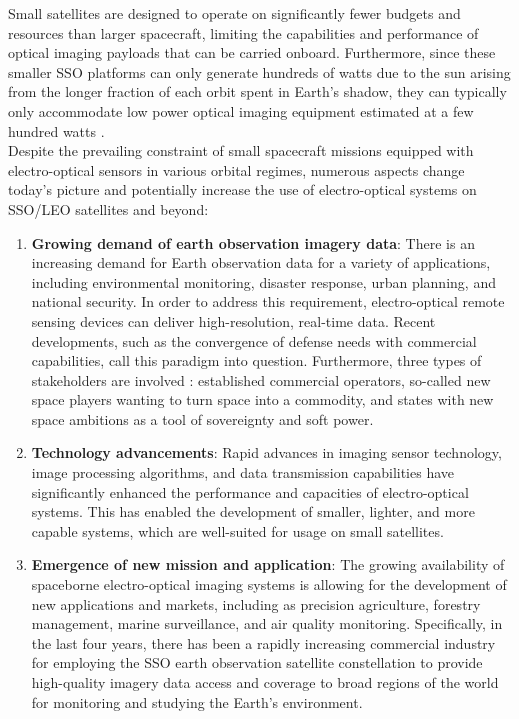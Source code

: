 \documentclass[final,5p,times,twocolumn]{elsarticle}
\begin{document}
Small satellites are designed to operate on significantly fewer budgets and resources than larger spacecraft, limiting the capabilities and performance of optical imaging payloads that can be carried onboard. Furthermore, since these smaller SSO platforms can only generate hundreds of watts due to the sun arising from the longer fraction of each orbit spent in Earth's shadow, they can typically only accommodate low power optical imaging equipment estimated at a few hundred watts \citep{selva2012survey}. \\
Despite the prevailing constraint of small spacecraft missions equipped with electro-optical sensors in various orbital regimes, numerous aspects change today's picture and potentially increase the use of electro-optical systems on SSO/LEO satellites and beyond:
\begin{enumerate}
	\item \textbf{Growing demand of earth observation imagery data}: There is an increasing demand for Earth observation data for a variety of applications, including environmental monitoring, disaster response, urban planning, and national security. In order to address this requirement, electro-optical remote sensing devices can deliver high-resolution, real-time data. Recent developments, such as the convergence of defense needs with commercial capabilities, call this paradigm into question. Furthermore, three types of stakeholders are involved  \citep{denis2017towards}: established commercial operators, so-called new space players wanting to turn space into a commodity, and states with new space ambitions as a tool of sovereignty and soft power.
	\item \textbf{Technology advancements}: Rapid advances in imaging sensor technology, image processing algorithms, and data transmission capabilities have significantly enhanced the performance and capacities of electro-optical systems. This has enabled the development of smaller, lighter, and more capable systems, which are well-suited for usage on small satellites.
	\item \textbf{Emergence of new mission and application}: The growing availability of spaceborne electro-optical imaging systems is allowing for the development of new applications and markets, including as precision agriculture, forestry management, marine surveillance, and air quality monitoring. Specifically, in the last four years, there has been a rapidly increasing commercial industry for employing the SSO earth observation satellite constellation \citep{sandau2010status} to provide high-quality imagery data access and coverage to broad regions of the world for monitoring and studying the Earth's environment.

\end{enumerate}
\end{document}
